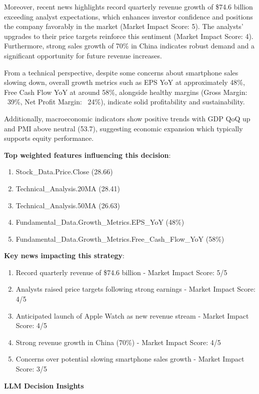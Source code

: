 \documentclass[8pt]{scrartcl}
\begin{document}
Moreover, recent news highlights record quarterly revenue growth of \$74.6 billion exceeding analyst expectations, which enhances investor confidence and positions the company favorably in the market (Market Impact Score: 5). The analysts' upgrades to their price targets reinforce this sentiment (Market Impact Score: 4). Furthermore, strong sales growth of 70\% in China indicates robust demand and a significant opportunity for future revenue increases.

From a technical perspective, despite some concerns about smartphone sales slowing down, overall growth metrics such as EPS YoY at approximately 48\%, Free Cash Flow YoY at around 58\%, alongside healthy margins (Gross Margin: ~39\%, Net Profit Margin: ~24\%), indicate solid profitability and sustainability.

Additionally, macroeconomic indicators show positive trends with GDP QoQ up and PMI above neutral (53.7), suggesting economic expansion which typically supports equity performance.

\textbf{Top weighted features influencing this decision}:
\begin{enumerate}
    \item Stock\_Data.Price.Close (28.66)
    \item Technical\_Analysis.20MA (28.41)
    \item Technical\_Analysis.50MA (26.63)
    \item Fundamental\_Data.Growth\_Metrics.EPS\_YoY (48\%)
    \item Fundamental\_Data.Growth\_Metrics.Free\_Cash\_Flow\_YoY (58\%)
\end{enumerate}

\textbf{Key news impacting this strategy}:
\begin{enumerate}
    \item Record quarterly revenue of \$74.6 billion - Market Impact Score: 5/5
    \item Analysts raised price targets following strong earnings - Market Impact Score: 4/5
    \item Anticipated launch of Apple Watch as new revenue stream - Market Impact Score: 4/5
    \item Strong revenue growth in China (70\%) - Market Impact Score: 4/5
    \item Concerns over potential slowing smartphone sales growth - Market Impact Score: 3/5
\end{enumerate}

\textbf{LLM Decision Insights}
\end{document}
